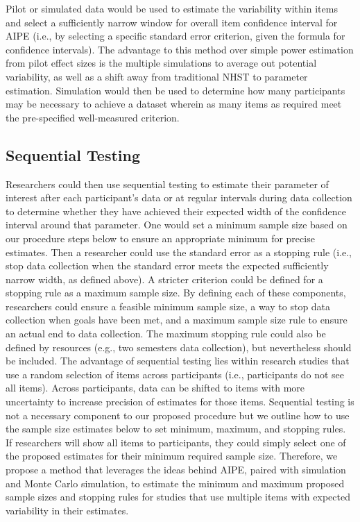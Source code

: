 \documentclass[
  man]{apa7}
\begin{document}
Pilot or simulated data would be used to estimate the variability within items and select a sufficiently narrow window for overall item confidence interval for AIPE (i.e., by selecting a specific standard error criterion, given the formula for confidence intervals). The advantage to this method over simple power estimation from pilot effect sizes is the multiple simulations to average out potential variability, as well as a shift away from traditional NHST to parameter estimation. Simulation would then be used to determine how many participants may be necessary to achieve a dataset wherein as many items as required meet the pre-specified well-measured criterion.

\subsection{Sequential Testing}\label{sequential-testing}

Researchers could then use sequential testing to estimate their parameter of interest after each participant's data or at regular intervals during data collection to determine whether they have achieved their expected width of the confidence interval around that parameter. One would set a minimum sample size based on our procedure steps below to ensure an appropriate minimum for precise estimates. Then a researcher could use the standard error as a stopping rule (i.e., stop data collection when the standard error meets the expected sufficiently narrow width, as defined above). A stricter criterion could be defined for a stopping rule as a maximum sample size. By defining each of these components, researchers could ensure a feasible minimum sample size, a way to stop data collection when goals have been met, and a maximum sample size rule to ensure an actual end to data collection. The maximum stopping rule could also be defined by resources (e.g., two semesters data collection), but nevertheless should be included. The advantage of sequential testing lies within research studies that use a random selection of items across participants (i.e., participants do not see all items). Across participants, data can be shifted to items with more uncertainty to increase precision of estimates for those items. Sequential testing is not a necessary component to our proposed procedure but we outline how to use the sample size estimates below to set minimum, maximum, and stopping rules. If researchers will show all items to participants, they could simply select one of the proposed estimates for their minimum required sample size. Therefore, we propose a method that leverages the ideas behind AIPE, paired with simulation and Monte Carlo simulation, to estimate the minimum and maximum proposed sample sizes and stopping rules for studies that use multiple items with expected variability in their estimates.
\end{document}
